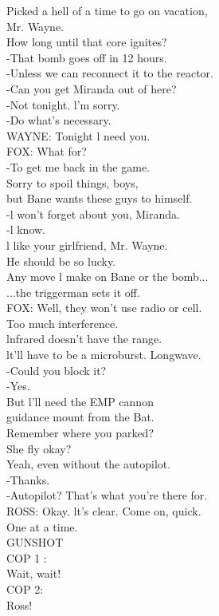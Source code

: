 \documentclass{article}
\begin{document}
\begin{multicols}{3}
Picked a hell of a time to go on vacation,\\
Mr. Wayne.\\
How long until that core ignites?\\
-That bomb goes off in 12 hours.\\
-Unless we can reconnect it to the reactor.\\
-Can you get Miranda out of here?\\
-Not tonight. l'm sorry.\\
-Do what's necessary.\\
WAYNE: Tonight l need you.\\
FOX: What for?\\
-To get me back in the game.\\
Sorry to spoil things, boys,\\
but Bane wants these guys to himself.\\
-l won't forget about you, Miranda.\\
-l know.\\
l like your girlfriend, Mr. Wayne.\\
He should be so lucky.\\
Any move l make on Bane or the bomb...\\
...the triggerman sets it off.\\
FOX: Well, they won't use radio or cell.\\
Too much interference.\\
lnfrared doesn't have the range.\\
lt'll have to be a microburst. Longwave.\\
-Could you block it?\\
-Yes.\\
But l'll need the EMP cannon\\
guidance mount from the Bat.\\
Remember where you parked?\\
She fly okay?\\
Yeah, even without the autopilot.\\
-Thanks.\\
-Autopilot? That's what you're there for.\\
ROSS: Okay. lt's clear. Come on, quick.\\
One at a time.\\
GUNSHOT\\
COP 1 :\\
Wait, wait!\\
COP 2:\\
Ross!\\

\end{multicols}
\end{document}
